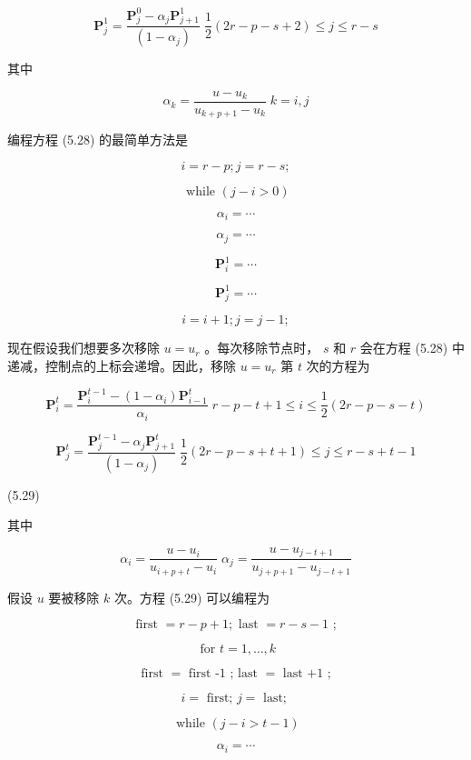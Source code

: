 \documentclass[../main.tex]{subfiles}
\begin{document}
\[
{\mathbf{P}}_{j}^{1} = \frac{{\mathbf{P}}_{j}^{0} - {\alpha }_{j}{\mathbf{P}}_{j + 1}^{1}}{\left( 1 - {\alpha }_{j}\right) }\;\frac{1}{2}\left( {{2r} - p - s + 2}\right)  \leq  j \leq  r - s \tag{5.28}
\]

其中

\[
{\alpha }_{k} = \frac{u - {u}_{k}}{{u}_{k + p + 1} - {u}_{k}}\;k = i,j
\]

编程方程 (5.28) 的最简单方法是

\[
i = r - p;j = r - s;
\]

\[
\text{ while }\left( {j - i > 0}\right)
\]

\[
{\alpha }_{i} = \cdots
\]

\[
{\alpha }_{j} = \cdots
\]

\[
{\mathbf{P}}_{i}^{1} = \cdots
\]

\[
{\mathbf{P}}_{j}^{1} = \cdots
\]

\[
i = i + 1;j = j - 1;
\]

现在假设我们想要多次移除 \(u = {u}_{r}\) 。每次移除节点时， \(s\) 和 \(r\) 会在方程 (5.28) 中递减，控制点的上标会递增。因此，移除 \(u = {u}_{r}\) 第 \(t\) 次的方程为

\[
{\mathbf{P}}_{i}^{t} = \frac{{\mathbf{P}}_{i}^{t - 1} - \left( {1 - {\alpha }_{i}}\right) {\mathbf{P}}_{i - 1}^{t}}{{\alpha }_{i}}\;r - p - t + 1 \leq  i \leq  \frac{1}{2}\left( {{2r} - p - s - t}\right)
\]

\[
{\mathbf{P}}_{j}^{t} = \frac{{\mathbf{P}}_{j}^{t - 1} - {\alpha }_{j}{\mathbf{P}}_{j + 1}^{t}}{\left( 1 - {\alpha }_{j}\right) }\;\frac{1}{2}\left( {{2r} - p - s + t + 1}\right)  \leq  j \leq  r - s + t - 1
\]

(5.29)

其中

\[
{\alpha }_{i} = \frac{u - {u}_{i}}{{u}_{i + p + t} - {u}_{i}}\;{\alpha }_{j} = \frac{u - {u}_{j - t + 1}}{{u}_{j + p + 1} - {u}_{j - t + 1}}
\]

假设 \(u\) 要被移除 \(k\) 次。方程 (5.29) 可以编程为

\[
\text{ first } = r - p + 1;\text{ last } = r - s - 1\text{ ; }
\]

\[
\text{ for }t = 1,\ldots ,k
\]

\[
\text{ first } = \text{ first -1 ; last } = \text{ last +1 ; }
\]

\[
i = \text{ first; }j = \text{ last; }
\]

\[
\text{ while }\left( {j - i > t - 1}\right)
\]

\[
{\alpha }_{i} = \cdots
\]
\end{document}

